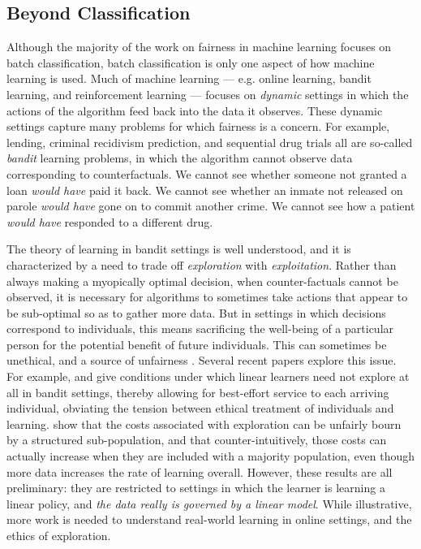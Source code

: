 \subsection{Beyond Classification}
Although the majority of the work on fairness in machine learning focuses on batch classification, batch classification is only one aspect of how machine learning is used. Much of machine learning --- e.g. online learning, bandit learning, and reinforcement learning --- focuses on \emph{dynamic} settings in which the actions of the algorithm feed back into the data it observes. These dynamic settings capture many problems for which fairness is a concern. For example, lending, criminal recidivism prediction, and sequential drug trials all are so-called \emph{bandit} learning problems, in which the algorithm cannot observe data corresponding to counterfactuals. We cannot see whether someone not granted a loan \emph{would have} paid it back. We cannot see whether an inmate not released on parole \emph{would have} gone on to commit another crime. We cannot see how a patient \emph{would have} responded to a different drug.

The theory of learning in bandit settings is well understood, and it is characterized by a need to trade off \emph{exploration} with \emph{exploitation}. Rather than always making a myopically optimal decision, when counter-factuals cannot be observed, it is necessary for algorithms to sometimes take actions that appear to be sub-optimal so as to gather more data. But in settings in which decisions correspond to individuals, this means sacrificing the well-being of a particular person for the potential benefit of future individuals. This can sometimes be unethical, and a source of unfairness \cite{explore}. Several recent papers explore this issue. For example, \cite{BBK17} and \cite{KMRWW18} give conditions under which linear learners need not explore at all in bandit settings, thereby allowing for best-effort service to each arriving individual, obviating the tension between ethical treatment of individuals and learning. \cite{RSVW18} show that the costs associated with exploration can be unfairly bourn by a structured sub-population, and that counter-intuitively, those costs can actually increase when they are included with a majority population, even though more data increases the rate of learning overall. However, these results are all preliminary: they are restricted to settings in which the learner is learning a linear policy, and \emph{the data really is governed by a linear model}. While illustrative, more work is needed to understand real-world learning in online settings, and the ethics of exploration.

